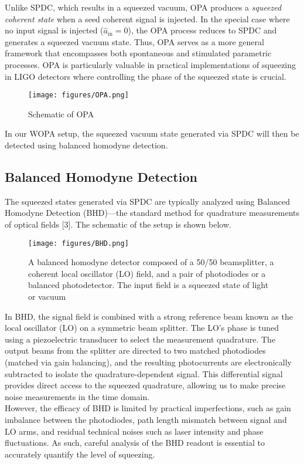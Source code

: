 \documentclass[colorlinks=true,pdfstartview=FitV,linkcolor=blue,
citecolor=red,urlcolor=magenta]{ligodoc}
\begin{document}
Unlike SPDC, which results in a squeezed vacuum, OPA produces a \textit{squeezed coherent state} when a seed coherent signal is injected. In the special case where no input signal is injected ($\hat{a}_\text{in} = 0$), the OPA process reduces to SPDC and generates a squeezed vacuum state. Thus, OPA serves as a more general framework that encompasses both spontaneous and stimulated parametric processes. OPA is particularly valuable in practical implementations of squeezing in LIGO detectors where controlling the phase of the squeezed state is crucial.
\begin{figure}[H]
    \centering
    \texttt{[image: figures/OPA.png]}
   \caption{  Schematic of OPA \cite{mckenzie}}
    \label{fig:enter-label}
\end{figure}


In our WOPA setup, the squeezed vacuum  state generated via SPDC  will then be detected using balanced homodyne detection.  
\subsection{Balanced Homodyne Detection}
The squeezed states generated via SPDC are typically analyzed using Balanced Homodyne Detection (BHD)—the standard method for quadrature measurements of optical fields [3]. The schematic of the setup is shown below.
\begin{figure}[H]
    \centering
    \texttt{[image: figures/BHD.png]}
   \caption{  A balanced homodyne detector composed of a 50/50 beamsplitter, a coherent local
oscillator (LO) field, and a pair of photodiodes or a balanced photodetector. The input field is a
squeezed state of light or vacuum\cite{goda}}
    \label{fig:enter-label}
\end{figure}

In BHD, the signal field is combined with a strong reference beam known as the local oscillator (LO) on a symmetric beam splitter. The LO’s phase is tuned using a piezoelectric transducer to select the measurement quadrature. The output beams from the splitter are directed to two matched photodiodes (matched via gain balancing), and the resulting photocurrents are electronically subtracted to isolate the quadrature-dependent signal. This differential signal provides direct access to the squeezed quadrature, allowing us to make precise noise measurements in the  time domain. \\

However, the efficacy of BHD is limited by practical imperfections, such as gain imbalance between the photodiodes, path length mismatch between signal and LO arms, and residual technical noises such as laser intensity and phase fluctuations. As such, careful analysis of the BHD readout is essential to accurately quantify the level of squeezing.
\end{document}
